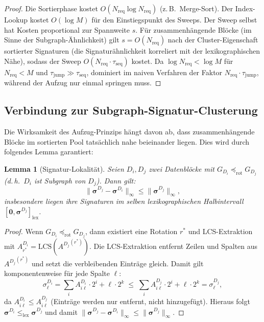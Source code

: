 ﻿\documentclass[a4paper,12pt]{article}
\theoremstyle{definition}
\theoremstyle{plain}
\newtheorem{lemma}{Lemma}[section]
\begin{document}
\begin{proof}
  Die Sortierphase kostet $O(N_{\mathrm{req}} \log N_{\mathrm{req}})$
  (z.\,B.\ Merge-Sort).  Der Index-Lookup kostet $O(\log M)$ für den
  Einstiegspunkt des Sweeps.  Der Sweep selbst hat Kosten proportional
  zur Spannweite $s$.  Für zusammenhängende Blöcke (im Sinne der
  Subgraph-Ähnlichkeit) gilt $s = O(N_{\mathrm{req}})$ nach der
  Cluster-Eigenschaft sortierter Signaturen (die Signaturähnlichkeit
  korreliert mit der lexikographischen Nähe), sodass der Sweep
  $O(N_{\mathrm{req}} \cdot \tau_{\mathrm{seq}})$ kostet.
  Da $\log N_{\mathrm{req}} < \log M$ für $N_{\mathrm{req}} < M$
  und $\tau_{\mathrm{jump}} \gg \tau_{\mathrm{seq}}$, dominiert im
  naiven Verfahren der Faktor $N_{\mathrm{req}} \cdot \tau_{\mathrm{jump}}$,
  während der Aufzug nur einmal springen muss. 
\end{proof}

\subsection{Verbindung zur Subgraph-Signatur-Clusterung}
\label{ssec:elevator_clusterung}

Die Wirksamkeit des Aufzug-Prinzips hängt davon ab, dass zusammenhängende
Blöcke im sortierten Pool tatsächlich nahe beieinander liegen.  Dies wird
durch folgendes Lemma garantiert:

\begin{lemma}[Signatur-Lokalität]
\label{lem:sig_lokalitaet}
  Seien $D_i, D_j$ zwei Datenblöcke mit
  $G_{D_i} \preceq_{\mathrm{rot}} G_{D_j}$
  (d.\,h.\ $D_i$ ist Subgraph von $D_j$).  Dann gilt:
  \[
    \|\boldsymbol{\sigma}^{D_j} - \boldsymbol{\sigma}^{D_i}\|_\infty
    \le \|\boldsymbol{\sigma}^{D_j}\|_\infty,
  \]
  insbesondere liegen ihre Signaturen im selben lexikographischen
  Halbintervall $[\mathbf{0}, \boldsymbol{\sigma}^{D_j}]_{\mathrm{lex}}$.
\end{lemma}

\begin{proof}
  Wenn $G_{D_i} \preceq_{\mathrm{rot}} G_{D_j}$, dann existiert eine
  Rotation $r^*$ und LCS-Extraktion mit
  $A^{D_i}_{r^*} = \mathrm{LCS}({A^{D_j}}^{(r^*)})$.
  Die LCS-Extraktion entfernt Zeilen und Spalten aus ${A^{D_j}}^{(r^*)}$
  und setzt die verbleibenden Einträge gleich.  Damit gilt
  komponentenweise für jede Spalte $\ell$:
  \[
    \sigma_\ell^{D_i} = \sum_i A^{D_i}_{i\ell} \cdot 2^i + \ell \cdot 2^k
    \;\le\;
    \sum_i A^{D_j}_{i\ell} \cdot 2^i + \ell \cdot 2^k
    = \sigma_\ell^{D_j},
  \]
  da $A^{D_i}_{i\ell} \le A^{D_j}_{i\ell}$ (Einträge werden nur entfernt,
  nicht hinzugefügt).  Hieraus folgt
  $\boldsymbol{\sigma}^{D_i} \le_{\mathrm{lex}} \boldsymbol{\sigma}^{D_j}$
  und damit
  $\|\boldsymbol{\sigma}^{D_j} - \boldsymbol{\sigma}^{D_i}\|_\infty
  \le \|\boldsymbol{\sigma}^{D_j}\|_\infty$. 
\end{proof}
\end{document}
